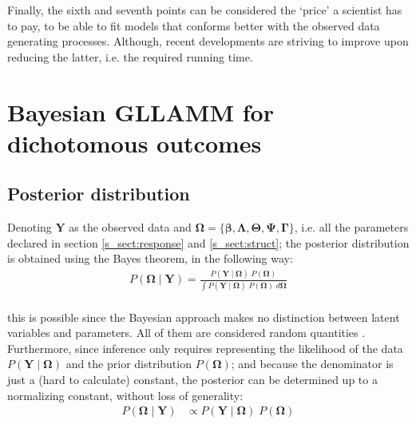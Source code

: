 Finally, the sixth and seventh points can be considered the `price' a scientist has to pay, to be able to fit models that conforms better with the observed data generating processes. Although, recent developments are striving to improve upon reducing the latter, i.e. the required running time.


\section{Bayesian GLLAMM for dichotomous outcomes} \label{sect:model}

\subsection{Posterior distribution}

Denoting $\mathbf{Y}$ as the observed data and $\pmb{\Omega} = \{ \pmb{\beta}, \pmb{\Lambda}, \pmb{\Theta}, \pmb{\Psi}, \pmb{\Gamma} \}$, i.e. all the parameters declared in section \ref{s_sect:response} and \ref{s_sect:struct}; the posterior distribution is obtained using the Bayes theorem, in the following way:
%
\begin{equation} \label{eq:posterior1}
	\begin{split}
		P(\pmb{\Omega} \; | \; \mathbf{Y}) = \frac{ P( \mathbf{Y} \; | \; \pmb{\Omega} ) \; P( \pmb{\Omega} ) }{ \int P( \mathbf{Y} \; | \; \pmb{\Omega} ) \; P( \pmb{\Omega} ) \; d\pmb{\Omega} } \\
	\end{split}
\end{equation}

\noindent this is possible since the Bayesian approach makes no distinction between latent variables and parameters. All of them are considered random quantities \cite{Skrondal_et_al_2004a}. Furthermore, since inference only requires representing the likelihood of the data $P( \mathbf{Y} \; | \; \pmb{\Omega} )$ and the prior distribution $P( \pmb{\Omega} )$; and because the denominator is just a (hard to calculate) constant, the posterior can be determined up to a normalizing constant, without loss of generality:
%
\begin{equation} \label{eq:posterior2}
	\begin{split}
		P(\pmb{\Omega} \; | \; \mathbf{Y}) &\propto P( \mathbf{Y} \; | \; \pmb{\Omega} ) \; P( \pmb{\Omega} )
	\end{split}
\end{equation}

